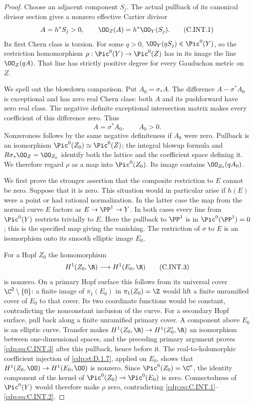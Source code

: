 \begin{proof}
Choose an adjacent component $S_j$. The actual pullback
of its canonical divisor section gives a nonzero effective
Cartier divisor
\[
 A=h^*S_j>0,\qquad \OO_Z(A)=h^*\OO_Y(S_j).
 \tag{C.INT.1}\label{cdp:eq:C.INT.1}
\]
Its first Chern class is torsion. For some $q>0$,
$\OO_Y(qS_j)\in\Pic^0(Y)$, so the restriction homomorphism
$\rho:\Pic^0(Y)\to\Pic^0(Z)$ has in its image the line
$\OO_Z(qA)$. That line has strictly positive degree for
every Gauduchon metric on $Z$.

We spell out the blowdown comparison. Put $A_0=\sigma_*A$.
The difference $A-\sigma^*A_0$ is exceptional and has
zero real Chern class: both $A$ and its pushforward have
zero real class. The negative definite exceptional
intersection matrix makes every coefficient of this
difference zero. Thus
\[
 A=\sigma^*A_0,\qquad A_0>0.
 \tag{C.INT.2}\label{cdp:eq:C.INT.2}
\]
Nonzeroness follows by the same negative definiteness if
$A_0$ were zero. Pullback is an isomorphism
$\Pic^0(Z_0)\simeq\Pic^0(Z)$; the integral blowup
formula and $R\sigma_*\OO_Z=\OO_{Z_0}$ identify both
the lattice and the coefficient space defining it.
We therefore regard $\rho$ as a map into $\Pic^0(Z_0)$.
Its image contains $\OO_{Z_0}(qA_0)$.

We first prove the stronger assertion that the composite
restriction to $E$ cannot be zero. Suppose that it is zero.
This situation would in particular arise if $h(E)$ were
a point or had rational normalization.
In the latter case the map from the normal curve $E$
factors as $E\to\PP^1\to Y$. In both cases every line
from $\Pic^0(Y)$ restricts trivially to $E$. Here the
pullback to $\PP^1$ is in $\Pic^0(\PP^1)=0$; this is
the specified map giving the vanishing. The restriction
of $\sigma$ to $E$ is an isomorphism onto its smooth
elliptic image $E_0$.

For a Hopf $Z_0$ the homomorphism
\[
 H^1(Z_0,\R)\longrightarrow H^1(E_0,\R)
 \tag{C.INT.3}\label{cdp:eq:C.INT.3}
\]
is nonzero. On a primary Hopf surface this follows from
its universal cover $\C^2\setminus\{0\}$: a finite image
of $\pi_1(E_0)$ in $\pi_1(Z_0)=\Z$ would lift a finite
unramified cover of $E_0$ to that cover. Its two coordinate
functions would be constant, contradicting the nonconstant
inclusion of the curve. For a secondary Hopf surface,
pull back along a finite unramified primary cover. A
component above $E_0$ is an elliptic curve. Transfer makes
$H^1(Z_0,\R)\to H^1(Z'_0,\R)$ an isomorphism between
one-dimensional spaces, and the preceding primary
argument proves \eqref{cdp:eq:C.INT.3} after this pullback, hence
before it. The real-to-holomorphic coefficient injection
of \ref{cdp:st:D.1.7}, applied on $E_0$, shows that
$H^1(Z_0,\OO)\to H^1(E_0,\OO)$ is nonzero. Since
$\Pic^0(Z_0)=\C^*$, the identity component of the
kernel of $\Pic^0(Z_0)\to\Pic^0(E_0)$ is zero.
Connectedness of $\Pic^0(Y)$ would therefore make
$\rho$ zero, contradicting \eqref{cdp:eq:C.INT.1}--\eqref{cdp:eq:C.INT.2}.


\end{proof}
